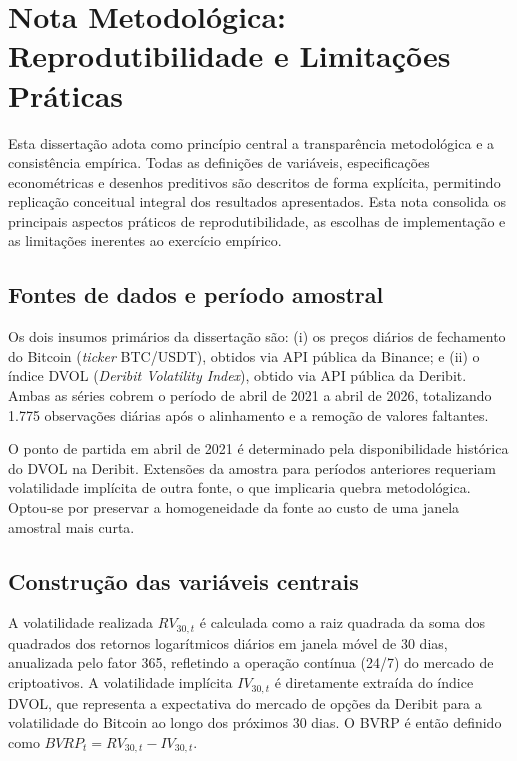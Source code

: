 ﻿\chapter*{Nota Metodológica: Reprodutibilidade e Limitações Práticas}
\label{chap:nota_metodologica}

Esta dissertação adota como princípio central a transparência metodológica e a
consistência empírica. Todas as definições de variáveis, especificações
econométricas e desenhos preditivos são descritos de forma explícita, permitindo
replicação conceitual integral dos resultados apresentados. Esta nota consolida
os principais aspectos práticos de reprodutibilidade, as escolhas de
implementação e as limitações inerentes ao exercício empírico.

\section*{Fontes de dados e período amostral}

Os dois insumos primários da dissertação são: (i) os preços diários de
fechamento do Bitcoin (\textit{ticker} BTC/USDT), obtidos via API pública da
Binance; e (ii) o índice DVOL (\textit{Deribit Volatility Index}), obtido via
API pública da Deribit. Ambas as séries cobrem o período de abril de 2021 a
abril de 2026, totalizando 1.775 observações diárias após o alinhamento e a
remoção de valores faltantes.

O ponto de partida em abril de 2021 é determinado pela disponibilidade
histórica do DVOL na Deribit. Extensões da amostra para períodos anteriores
requeriam volatilidade implícita de outra fonte, o que implicaria quebra
metodológica. Optou-se por preservar a homogeneidade da fonte ao custo de uma
janela amostral mais curta.

\section*{Construção das variáveis centrais}

A volatilidade realizada $RV_{30,t}$ é calculada como a raiz quadrada da soma
dos quadrados dos retornos logarítmicos diários em janela móvel de 30 dias,
anualizada pelo fator 365, refletindo a operação contínua (24/7) do mercado de
criptoativos. A volatilidade implícita $IV_{30,t}$ é diretamente extraída do
índice DVOL, que representa a expectativa do mercado de opções da Deribit para
a volatilidade do Bitcoin ao longo dos próximos 30 dias. O BVRP é então definido
como $BVRP_t = RV_{30,t} - IV_{30,t}$.

